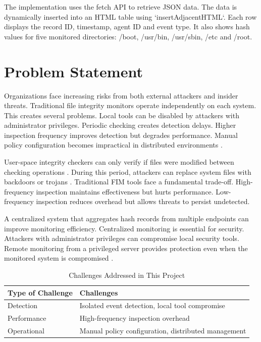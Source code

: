 \documentclass[conference]{IEEEtran}
\begin{document}
The implementation uses the fetch API to retrieve JSON data. The data is dynamically inserted into an HTML table using `insertAdjacentHTML`. Each row displays the record ID, timestamp, agent ID and event type. It also shows hash values for five monitored directories: /boot, /usr/bin, /usr/sbin, /etc and /root.

\section{Problem Statement}

Organizations face increasing risks from both external attackers and insider threats. Traditional file integrity monitors operate independently on each system. This creates several problems. Local tools can be disabled by attackers with administrator privileges. Periodic checking creates detection delays. Higher inspection frequency improves detection but degrades performance. Manual policy configuration becomes impractical in distributed environments \cite{abdullah}.

User-space integrity checkers can only verify if files were modified between checking operations \cite{kaczmarek}. During this period, attackers can replace system files with backdoors or trojans \cite{kaczmarek}. Traditional FIM tools face a fundamental trade-off. High-frequency inspection maintains effectiveness but hurts performance. Low-frequency inspection reduces overhead but allows threats to persist undetected.

A centralized system that aggregates hash records from multiple endpoints can improve monitoring efficiency. Centralized monitoring is essential for security. Attackers with administrator privileges can compromise local security tools. Remote monitoring from a privileged server provides protection even when the monitored system is compromised \cite{abdullah}.

\begin{table}[h]
\centering
\caption{Challenges Addressed in This Project}
\begin{tabular}{|p{4cm}|p{4cm}|}
\hline
\textbf{Type of Challenge} & \textbf{Challenges} \\
\hline
Detection & Isolated event detection, local tool compromise \\
\hline
Performance & High-frequency inspection overhead \\
\hline
Operational & Manual policy configuration, distributed management \\
\hline
\end{tabular}
\end{table}
\end{document}
